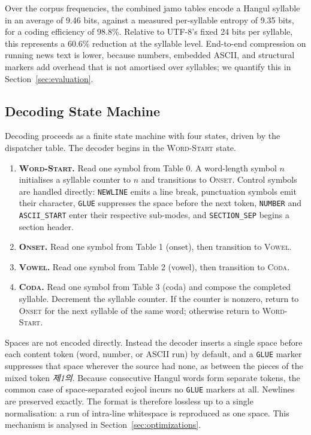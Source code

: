 \documentclass[conference]{IEEEtran}
\begin{document}
Over the corpus frequencies, the combined jamo tables encode a Hangul
syllable in an average of 9.46 bits, against a measured per-syllable entropy
of 9.35 bits, for a coding efficiency of 98.8\%. Relative to UTF-8's fixed
24 bits per syllable, this represents a 60.6\% reduction at the syllable
level. End-to-end compression on running news text is lower, because numbers,
embedded ASCII, and structural markers add overhead that is not amortised over
syllables; we quantify this in Section~\ref{sec:evaluation}.

\subsection{Decoding State Machine}

Decoding proceeds as a finite state machine with four states, driven by the
dispatcher table. The decoder begins in the \textsc{Word-Start} state.

\begin{enumerate}
    \item \textbf{\textsc{Word-Start}.} Read one symbol from Table 0. A
    word-length symbol $n$ initialises a syllable counter to $n$ and
    transitions to \textsc{Onset}. Control symbols are handled directly:
    \texttt{NEWLINE} emits a line break, punctuation symbols emit their
    character, \texttt{GLUE} suppresses the space before the next token,
    \texttt{NUMBER} and \texttt{ASCII\_START} enter their respective
    sub-modes, and \texttt{SECTION\_SEP} begins a section header.
    \item \textbf{\textsc{Onset}.} Read one symbol from Table 1 (onset),
    then transition to \textsc{Vowel}.
    \item \textbf{\textsc{Vowel}.} Read one symbol from Table 2 (vowel),
    then transition to \textsc{Coda}.
    \item \textbf{\textsc{Coda}.} Read one symbol from Table 3 (coda) and
    compose the completed syllable. Decrement the syllable counter. If the
    counter is nonzero, return to \textsc{Onset} for the next syllable of
    the same word; otherwise return to \textsc{Word-Start}.
\end{enumerate}

Spaces are not encoded directly. Instead the decoder inserts a single space
before each content token (word, number, or ASCII run) by default, and a
\texttt{GLUE} marker suppresses that space wherever the source had none, as
between the pieces of the mixed token \emph{제1의}. Because consecutive Hangul
words form separate tokens, the common case of space-separated eojeol incurs no
\texttt{GLUE} markers at all. Newlines are preserved exactly. The format is
therefore lossless up to a single normalisation: a run of intra-line whitespace
is reproduced as one space. This mechanism is analysed in
Section~\ref{sec:optimizations}.
\end{document}

